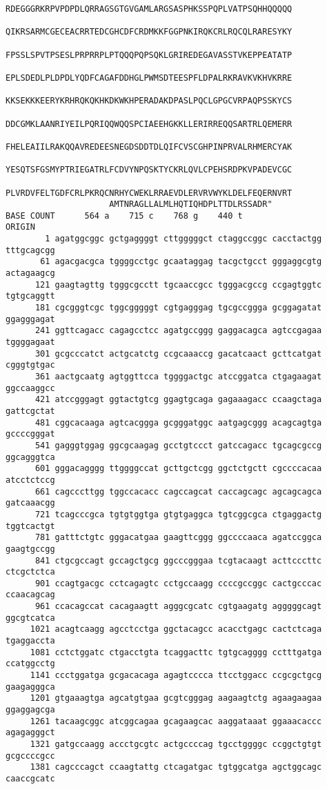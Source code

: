 \begin{lstlisting}[language={},basicstyle=\small\tt,breaklines=false]
                     RDEGGGRKRPVPDPDLQRRAGSGTGVGAMLARGSASPHKSSPQPLVATPSQHHQQQQQ
                     QIKRSARMCGECEACRRTEDCGHCDFCRDMKKFGGPNKIRQKCRLRQCQLRARESYKY
                     FPSSLSPVTPSESLPRPRRPLPTQQQPQPSQKLGRIREDEGAVASSTVKEPPEATATP
                     EPLSDEDLPLDPDLYQDFCAGAFDDHGLPWMSDTEESPFLDPALRKRAVKVKHVKRRE
                     KKSEKKKEERYKRHRQKQKHKDKWKHPERADAKDPASLPQCLGPGCVRPAQPSSKYCS
                     DDCGMKLAANRIYEILPQRIQQWQQSPCIAEEHGKKLLERIRREQQSARTRLQEMERR
                     FHELEAIILRAKQQAVREDEESNEGDSDDTDLQIFCVSCGHPINPRVALRHMERCYAK
                     YESQTSFGSMYPTRIEGATRLFCDVYNPQSKTYCKRLQVLCPEHSRDPKVPADEVCGC
                     PLVRDVFELTGDFCRLPKRQCNRHYCWEKLRRAEVDLERVRVWYKLDELFEQERNVRT
                     AMTNRAGLLALMLHQTIQHDPLTTDLRSSADR"
BASE COUNT      564 a    715 c    768 g    440 t
ORIGIN      
        1 agatggcggc gctgaggggt cttgggggct ctaggccggc cacctactgg tttgcagcgg
       61 agacgacgca tggggcctgc gcaataggag tacgctgcct gggaggcgtg actagaagcg
      121 gaagtagttg tgggcgcctt tgcaaccgcc tgggacgccg ccgagtggtc tgtgcaggtt
      181 cgcgggtcgc tggcgggggt cgtgagggag tgcgccggga gcggagatat ggagggagat
      241 ggttcagacc cagagcctcc agatgccggg gaggacagca agtccgagaa tggggagaat
      301 gcgcccatct actgcatctg ccgcaaaccg gacatcaact gcttcatgat cgggtgtgac
      361 aactgcaatg agtggttcca tggggactgc atccggatca ctgagaagat ggccaaggcc
      421 atccgggagt ggtactgtcg ggagtgcaga gagaaagacc ccaagctaga gattcgctat
      481 cggcacaaga agtcacggga gcgggatggc aatgagcggg acagcagtga gccccgggat
      541 gagggtggag ggcgcaagag gcctgtccct gatccagacc tgcagcgccg ggcagggtca
      601 gggacagggg ttggggccat gcttgctcgg ggctctgctt cgccccacaa atcctctccg
      661 cagcccttgg tggccacacc cagccagcat caccagcagc agcagcagca gatcaaacgg
      721 tcagcccgca tgtgtggtga gtgtgaggca tgtcggcgca ctgaggactg tggtcactgt
      781 gatttctgtc gggacatgaa gaagttcggg ggccccaaca agatccggca gaagtgccgg
      841 ctgcgccagt gccagctgcg ggcccgggaa tcgtacaagt acttcccttc ctcgctctca
      901 ccagtgacgc cctcagagtc cctgccaagg ccccgccggc cactgcccac ccaacagcag
      961 ccacagccat cacagaagtt agggcgcatc cgtgaagatg agggggcagt ggcgtcatca
     1021 acagtcaagg agcctcctga ggctacagcc acacctgagc cactctcaga tgaggaccta
     1081 cctctggatc ctgacctgta tcaggacttc tgtgcagggg cctttgatga ccatggcctg
     1141 ccctggatga gcgacacaga agagtcccca ttcctggacc ccgcgctgcg gaagagggca
     1201 gtgaaagtga agcatgtgaa gcgtcgggag aagaagtctg agaagaagaa ggaggagcga
     1261 tacaagcggc atcggcagaa gcagaagcac aaggataaat ggaaacaccc agagagggct
     1321 gatgccaagg accctgcgtc actgccccag tgcctggggc ccggctgtgt gcgccccgcc
     1381 cagcccagct ccaagtattg ctcagatgac tgtggcatga agctggcagc caaccgcatc

\end{lstlisting}
